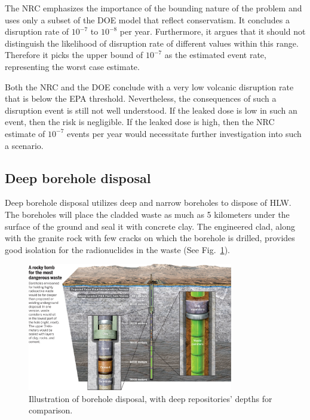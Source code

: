 \documentclass[nofootinbib,preprint,aip,pra]{revtex4-1}
\begin{document}
        The NRC emphasizes the importance of the bounding nature of the problem and uses only a subset
        of the DOE model that reflect conservatism. It concludes a disruption rate of
        $10^{-7}$ to $10^{-8}$ per year. Furthermore, it argues that it should not distinguish the likelihood
        of disruption rate of different values within this range. Therefore it picks the upper bound
        of $10^{-7}$ as the estimated event rate, representing the worst case estimate.

        Both the NRC and the DOE conclude with a very low volcanic disruption rate that is below the EPA
        threshold. Nevertheless, the consequences of such a disruption event is still not well understood.
        If the leaked dose is low in such an event, then the risk is negligible. If the leaked dose is high,
        then the NRC estimate of $10^{-7}$ events per year would necessitate further investigation into such
        a scenario.\cite{me06}
        \subsection{Deep borehole disposal}
        Deep borehole disposal utilizes deep and narrow boreholes to dispose of HLW. The boreholes
        will place the cladded waste as much as 5 kilometers under the surface of the ground and seal it
        with concrete clay.
        The engineered clad, along with the granite rock with few cracks on which the borehole is drilled,
        provides
        good isolation for the radionuclides in the waste (See Fig.~\ref{fig:borehole}).
        \begin{figure}[h]
            \label{fig:borehole}
            \centering
            \includegraphics[width=0.8\textwidth]{borehole.jpg}
            \caption{Illustration of borehole disposal, with deep repositories' depths for comparison.\cite{c15}}
        \end{figure}
\end{document}
